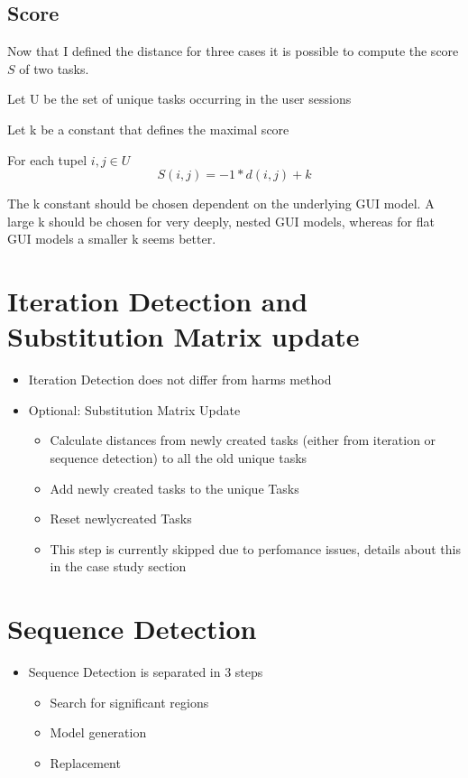 \subsection{Score}
Now that I defined the distance for three cases it is possible to compute the score $S$ of two tasks.
\begin{definition}
	\item Let U be the set of unique tasks occurring in the user sessions
	\item Let k be a constant that defines the maximal score 
	\item For each tupel $i,j \in U$ 
\begin{equation*}
		 S(i,j) = -1*d(i,j)+k
	\label{eq:subscore}
\end{equation*}
\end{definition}

The k constant should be chosen dependent on the underlying GUI model. A large k should be chosen for very deeply, nested GUI models, whereas for flat GUI models a smaller k seems better. 

\section{Iteration Detection and Substitution Matrix update}
\begin{itemize}
	\item Iteration Detection does not differ from harms method
	\item Optional: Substitution Matrix Update 
	\begin{itemize}
		\item Calculate distances from newly created tasks (either from iteration or sequence detection) to all the old unique tasks
		\item Add newly created tasks to the unique Tasks
		\item Reset newlycreated Tasks
		\item This step is currently skipped due to perfomance issues, details about this in the case study section
	\end{itemize}
\end{itemize}


\section{Sequence Detection}
\begin{itemize}
	\item Sequence Detection is separated in 3 steps
	\begin{itemize}
		\item Search for significant regions
		\item Model generation
		\item Replacement
	\end{itemize}
\end{itemize}
